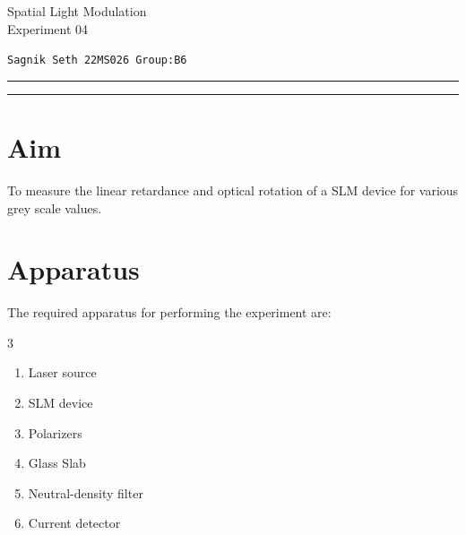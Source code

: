 \documentclass[usenames, svgnames, dvipsnames]{scrartcl}
\begin{document}
        \begin{center}
            {\rmfamily
                \Large{\textcolor{blue!30!black}{%
                    \textmd{{\Large{{S}}}}patial \textmd{{\Large{{L}}}}ight \textmd{{\Large{{M}}}}odulation \\
                     {\Large Experiment} 04%
                }}\\[0.4cm]
            }
            \end{center}
        \begin{center}
           \large \texttt{{{\LARGE  S}agnik {\LARGE S}eth\hspace{0.3cm} 22MS026 \hspace{0.3cm} Group:B6}}
        \end{center}
\hrule
\vspace{0.08cm}
\hrule
\vspace{0.6cm}
\section{Aim}
 To measure the linear retardance and optical rotation of a SLM device for various grey scale values.

\section{Apparatus}
The required apparatus for performing the experiment are:
\begin{multicols}{3}
\begin{enumerate}
  \item Laser source
  \item SLM device 
  \item Polarizers 
  \item Glass Slab
  \item Neutral-density filter
  \item Current detector
\end{enumerate}
\end{multicols}




\end{document}
